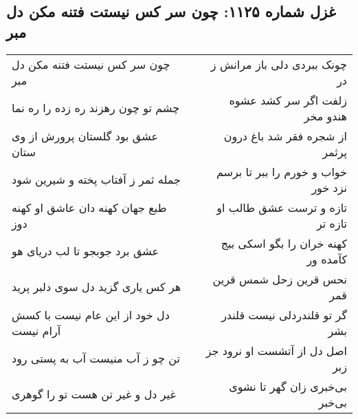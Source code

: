 \begin{center}
\section*{غزل شماره ۱۱۲۵: چون سر کس نیستت فتنه مکن دل مبر}
\label{sec:1125}
\begin{longtable}{l p{0.5cm} r}
چون سر کس نیستت فتنه مکن دل مبر
&&
چونک ببردی دلی باز مرانش ز در
\\
چشم تو چون رهزند ره زده را ره نما
&&
زلفت اگر سر کشد عشوه هندو مخر
\\
عشق بود گلستان پرورش از وی ستان
&&
از شجره فقر شد باغ درون پرثمر
\\
جمله ثمر ز آفتاب پخته و شیرین شود
&&
خواب و خورم را ببر تا برسم نزد خور
\\
طبع جهان کهنه دان عاشق او کهنه دوز
&&
تازه و ترست عشق طالب او تازه تر
\\
عشق برد جوبجو تا لب دریای هو
&&
کهنه خران را بگو اسکی ببج کآمده ور
\\
هر کس یاری گزید دل سوی دلبر پرید
&&
نحس قرین زحل شمس قرین قمر
\\
دل خود از این عام نیست با کسش آرام نیست
&&
گر تو قلندردلی نیست قلندر بشر
\\
تن چو ز آب منیست آب به پستی رود
&&
اصل دل از آتشست او نرود جز زبر
\\
غیر دل و غیر تن هست تو را گوهری
&&
بی‌خبری زان گهر تا نشوی بی‌خبر
\\
\end{longtable}
\end{center}
